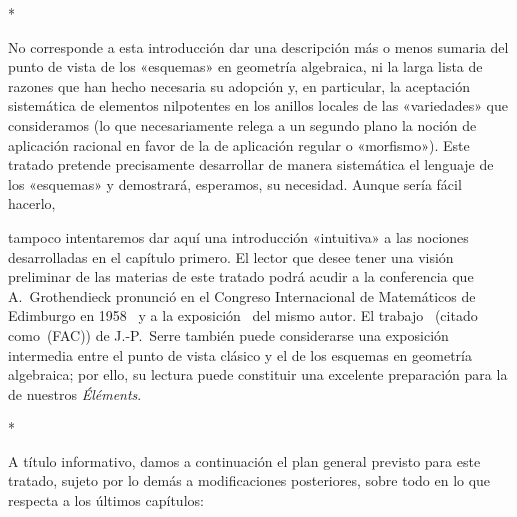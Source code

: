 \bigskip
\begin{center}*\quad*\quad*\end{center}
\bigskip

No corresponde a esta introducción dar una descripción más o menos sumaria del punto de vista de los «esquemas» en geometría algebraica, ni la larga lista de razones que han hecho necesaria su adopción y, en particular, la aceptación sistemática de elementos nilpotentes en los anillos locales de las «variedades» que consideramos (lo que necesariamente relega a un segundo plano la noción de aplicación racional en favor de la de aplicación regular o «morfismo»).
Este tratado pretende precisamente desarrollar de manera sistemática el lenguaje de los «esquemas» y demostrará, esperamos, su necesidad.
Aunque sería fácil hacerlo,

tampoco intentaremos dar aquí una introducción «intuitiva» a las nociones desarrolladas en el capítulo primero.
El lector que desee tener una visión preliminar de las materias de este tratado podrá acudir a la conferencia que A.~Grothendieck pronunció en el Congreso Internacional de Matemáticos de Edimburgo en 1958~\cite{I-7} y a la exposición~\cite{I-8} del mismo autor.
El trabajo~\cite{I-14} (citado como~(FAC)) de J.-P.~Serre también puede considerarse una exposición intermedia entre el punto de vista clásico y el de los esquemas en geometría algebraica; por ello, su lectura puede constituir una excelente preparación para la de nuestros \emph{Éléments}.

\bigskip
\begin{center}*\quad*\quad*\end{center}
\bigskip

A título informativo, damos a continuación el plan general previsto para este tratado, sujeto por lo demás a modificaciones posteriores, sobre todo en lo que respecta a los últimos capítulos:


